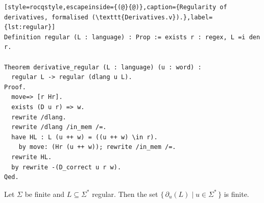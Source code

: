\begin{lstlisting}[style=rocqstyle,escapeinside={(@}{@)},caption={Regularity of derivatives, formalised (\texttt{Derivatives.v}).},label={lst:regular}]
Definition regular (L : language) : Prop := exists r : regex, L =i den r.

Theorem derivative_regular (L : language) (u : word) :
  regular L -> regular (dlang u L).
Proof.
  move=> [r Hr].
  exists (D u r) => w.
  rewrite /dlang.
  rewrite /dlang /in_mem /=.
  have HL : L (u ++ w) = ((u ++ w) \in r).
    by move: (Hr (u ++ w)); rewrite /in_mem /=.
  rewrite HL.
  by rewrite -(D_correct u r w).
Qed.
\end{lstlisting}

\begin{theorem}\label{the:derivative-set-is-finite}
Let $\Sigma$ be finite and $L\subseteq\Sigma^{*}$ regular. Then the set
$\{\,\partial_{u}(L)\mid u \in \Sigma^*\,\}$ is finite.
\end{theorem}

